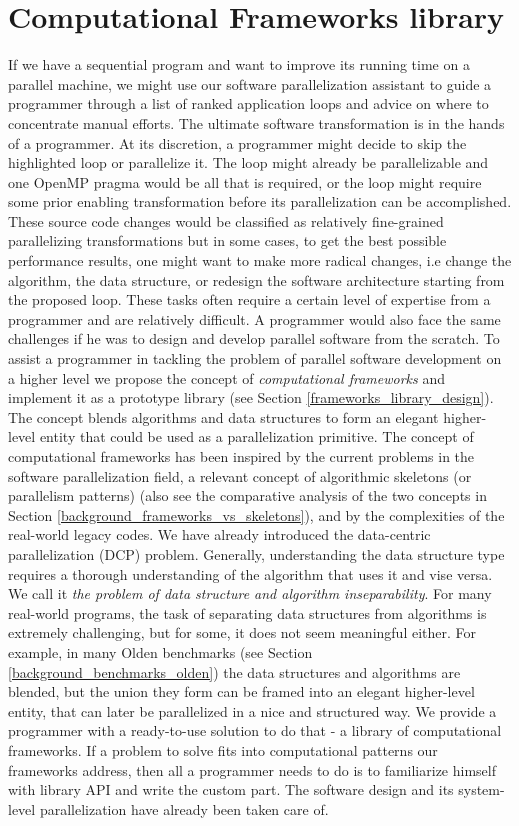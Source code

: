 \section{Computational Frameworks library}
\label{introduction_frameworks}
\quad If we have a sequential program and want to improve its running time on a parallel machine, we might use our software parallelization assistant to guide a programmer through a list of ranked application loops and advice on where to concentrate manual efforts. The ultimate software transformation is in the hands of a programmer. At its discretion, a programmer might decide to skip the highlighted loop or parallelize it. The loop might already be parallelizable and one OpenMP pragma would be all that is required, or the loop might require some prior enabling transformation before its parallelization can be accomplished. These source code changes would be classified as relatively fine-grained parallelizing transformations but in some cases, to get the best possible performance results, one might want to make more radical changes, i.e change the algorithm, the data structure, or redesign the software architecture starting from the proposed loop. These tasks often require a certain level of expertise from a programmer and are relatively difficult. A programmer would also face the same challenges if he was to design and develop parallel software from the scratch.\newline\null
\quad To assist a programmer in tackling the problem of parallel software development on a higher level we propose the concept of \textit{computational frameworks} and implement it as a prototype library (see Section \ref{frameworks_library_design}). The concept blends algorithms and data structures to form an elegant higher-level entity that could be used as a parallelization primitive. The concept of computational frameworks has been inspired by the current problems in the software parallelization field, a relevant concept of algorithmic skeletons (or parallelism patterns) (also see the comparative analysis of the two concepts in Section \ref{background_frameworks_vs_skeletons}), and by the complexities of the real-world legacy codes. We have already introduced the data-centric parallelization (DCP) problem. Generally, understanding the data structure type requires a thorough understanding of the algorithm that uses it and vise versa. We call it \textit{the problem of data structure and algorithm inseparability}. For many real-world programs, the task of separating data structures from algorithms is extremely challenging, but for some, it does not seem meaningful either. For example, in many Olden benchmarks (see Section \ref{background_benchmarks_olden}) the data structures and algorithms are blended, but the union they form can be framed into an elegant higher-level entity, that can later be parallelized in a nice and structured way. We provide a programmer with a ready-to-use solution to do that - a library of computational frameworks. If a problem to solve fits into computational patterns our frameworks address, then all a programmer needs to do is to familiarize himself with library API and write the custom part. The software design and its system-level parallelization have already been taken care of.\newline\null 
